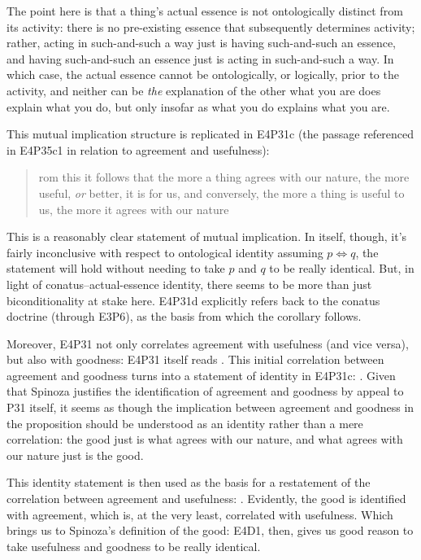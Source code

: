 \documentclass{article}
\newcommand{\dash}{\unskip{—}}
\begin{document}
The point here is that a thing's actual essence is not ontologically distinct from its activity: there is no pre-existing essence that subsequently determines activity; rather, acting in such-and-such a way just is having such-and-such an essence, and having such-and-such an essence just is acting in such-and-such a way. In which case, the actual essence cannot be ontologically, or logically, prior to the activity, and neither can be \emph{the} explanation of the other \dash what you are does explain what you do, but only insofar as what you do explains what you are.

This mutual implication structure is replicated in E4P31c (the passage referenced in E4P35c1 in relation to agreement and usefulness): \blockquote[][.]{rom this it follows that the more a thing agrees with our nature, the more useful, \emph{or} better, it is for us, and conversely, the more a thing is useful to us, the more it agrees with our nature} This is a reasonably clear statement of mutual implication. In itself, though, it's fairly inconclusive with respect to ontological identity \dash assuming $p \iff q$, the statement will hold without needing to take $p$ and $q$ to be really identical. But, in light of conatus–actual-essence identity, there seems to be more than just biconditionality at stake here. E4P31d explicitly refers back to the conatus doctrine (through E3P6), as the basis from which the corollary follows.

Moreover, E4P31 not only correlates agreement with usefulness (and vice versa), but also with goodness: E4P31 itself reads . This initial correlation between agreement and goodness turns into a statement of identity in E4P31c: . Given that Spinoza justifies the identification of agreement and goodness by appeal to P31 itself, it seems as though the implication between agreement and goodness in the proposition should be understood as an identity rather than a mere correlation: the good just is what agrees with our nature, and what agrees with our nature just is the good.

This identity statement is then used as the basis for a restatement of the correlation between agreement and usefulness: . Evidently, the good is identified with agreement, which is, at the very least, correlated with usefulness. Which brings us to Spinoza's definition of the good:  E4D1, then, gives us good reason to take usefulness and goodness to be really identical.
\end{document}
